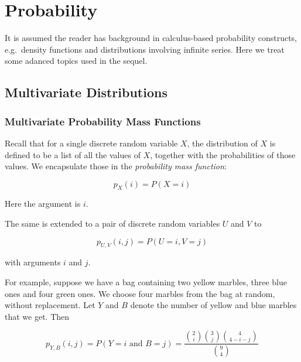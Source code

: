 \chapter{Probability}


It is assumed the reader has background in calculus-based probability
constructs, e.g.\ density functions and distributions involving
infinite series.  Here we treat some adanced topics used in the sequel.

\section{Multivariate Distributions}

\subsection{Multivariate Probability Mass Functions}
\label{marblepmf}

Recall that for a single discrete random variable $X$, the distribution of
$X$ is defined to be a list of all the values of $X$, together with the
probabilities of those values.  We encapsulate those in the
\textit{probability mass function}:

\begin{equation}
p_X(i) = P(X = i)
\end{equation}

Here the argument is $i$.

The same is extended to a pair of discrete random variables $U$ and $V$ to

\begin{equation}
p_{U,V}(i,j) = P(U = i, V = j)
\end{equation}

with arguments $i$ and $j$.

For example, suppose we have a bag containing two yellow marbles, three
blue ones and four green ones.  We choose four marbles from the bag at
random, without replacement.  Let $Y$ and $B$ denote the number of yellow
and blue marbles that we get.  Then

\begin{equation}
p_{Y,B}(i,j) = P(Y = i \textrm{ and } B = j) = 
\frac
{
\binom{2}{i}
\binom{3}{j}
\binom{4}{4-i-j}
}
{\binom{9}{4}}
\end{equation}

